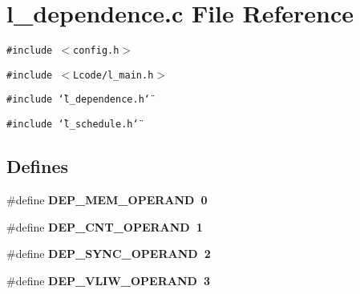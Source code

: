 \section{l\_\-dependence.c File Reference}
\label{l__dependence_8c}
{\tt \#include $<$config.h$>$}\par
{\tt \#include $<$Lcode/l\_\-main.h$>$}\par
{\tt \#include \char`\"{}l\_\-dependence.h\char`\"{}}\par
{\tt \#include \char`\"{}l\_\-schedule.h\char`\"{}}\par
\subsection*{Defines}
\begin{CompactItemize}
\item 
\#define \bf{DEP\_\-MEM\_\-OPERAND}~0
\item 
\#define \bf{DEP\_\-CNT\_\-OPERAND}~1
\item 
\#define \bf{DEP\_\-SYNC\_\-OPERAND}~2
\item 
\#define \bf{DEP\_\-VLIW\_\-OPERAND}~3
\end{CompactItemize}
